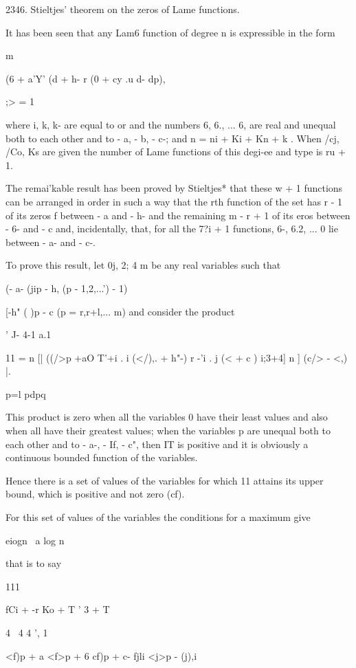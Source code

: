 {{{{{{{2346. Stieltjes' theorem on the zeros of Lame functions.

It has been seen that any Lam6 function of degree n is expressible in
the form

m

(6 + a'Y' (d + h- r (0 + cy .u d- dp),

;> = 1

where i, k, k- are equal to or and the numbers 6, 6., ... 6, are
real and unequal both to each other and to - a, - b, - c-; and n =
ni + Ki + Kn + k . When /cj, /Co, Ks are given the number of Lame
functions of this degi-ee and type is ru + 1.

%
%

The remai'kable result has been proved by Stieltjes* that these w + 1
functions can be arranged in order in such a way that the rth function
of the set has r - 1 of its zeros f between - a and - h- and the
remaining m - r + 1 of its eros between - 6- and - c and,
incidentally, that, for all the 7?i + 1 functions, 6-, 6.2, ... 0 lie
between - a- and - c-.

To prove this result, let 0j, 2;  4 m be any real variables such
that

(- a- (jip - h, (p - 1,2,...') - 1)

[-h" ( )p - c (p = r,r+l,... m) and consider the product

 ' J- 4-1 a.1

11 = n [| ((/>p +aO T'+i . i (</),. + h"-) r -'i . j (< + c ) i;3+4] n
] (c/> - <,) |.

p=l pdpq

This product is zero when all the variables 0 have their least values
and also when all have their greatest values; when the variables p
are unequal both to each other and to - a-, - If, - c", then IT is
positive and it is obviously a continuous bounded function of the
variables.

Hence there is a set of values of the variables for which 11 attains
its upper bound, which is positive and not zero (cf).

For this set of values of the variables the conditions for a maximum
give

eiogn \ a log n \

that is to say

111

fCi + -r Ko + T ' 3 + T

4 \ 4 4 ', 1 \

<f)p + a <f>p + 6 cf)p + c- fjli <j>p - (j),i

}}}}}}}
